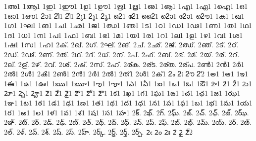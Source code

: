 {%
1അ1
1ആ1
1ഇ1
1ഈ1
1ഉ1
1ഊ1
1ഋ1
1ൠ1
1ഌ1
1ൡ1
1എ1
1ഏ1
1ഐ1
1ഒ1
1ഓ1
1ഔ1
2ാ1
2ി1
2ീ1
2ു1
2ൂ1
2ൃ1
2െ1
2േ1
2ൈ1
2ൊ1
2ോ1
2ൌ1
1ക1
1ഖ1
1ഗ1
1ഘ1
1ങ1
1ച1
1ഛ1
1ജ1
1ഝ1
1ഞ1
1ട1
1ഠ1
1ഡ1
1ഢ1
1ണ1
1ത1
1ഥ1
1ദ1
1ധ1
1ന1
1പ1
1ഫ1
1ബ1
1ഭ1
1മ1
1യ1
1ര1
1റ1 %
1ല1
1ള1
1ഴ1 %
1വ1
1ശ1
1ഷ1
1സ1
1ഹ1
2ക്.
2ഖ്.
2ഗ്.
2ഘ്.
2ങ്.
2ച്.
2ഛ്.
2ജ്.
2ഝ്.
2ഞ്.
2ട്.
2ഠ്.
2ഡ്.
2ഢ്.
2ണ്.
2ത്.
2ഥ്.
2ദ്.
2ധ്.
2ന്.
2പ്.
2ഫ്.
2ബ്.
2ഭ്.
2മ്.
2യ്.
2ര്.
2റ്. %
2ല്.
2ള്.
2ഴ്. %
2വ്.
2ശ്.
2ഷ്.
2സ്.
2ഹ്.
2ര്ക.
2ര്ട.
2ര്ത.
2ര്പ.
2ൺ1
2ൻ1
2ർ1
2ൽ1
2ൾ1
2ൿ1
2ണ്‍1
2ന്‍1
2ര്‍1
2ല്‍1
2ത്‍1
2ള്‍1
2ക്‍1
2ം
2ഃ
2ൗ
2്2
1అ1
1ఆ1
1ఇ1
1ఈ1
1ఉ1
1ఊ1
1ఋ1
1ౠ1
1ఌ1
1ౡ1
1ఎ1
1ఏ1
1ఐ1
1ఒ1
1ఓ1
1ఔ1
2ా1
2ి1
2ీ1
2ు1
2ూ1
2ృ1
2ౄ1
2ె1
2ే1
2ై1
2ొ1
2ో1
2ౌ1
1క1
1ఖ1
1గ1
1ఘ1
1ఙ1
1చ1
1ఛ1
1జ1
1ఝ1
1ఞ1
1ట1
1ఠ1
1డ1
1ఢ1
1ణ1
1త1
1థ1
1ద1
1ధ1
1న1
1ప1
1ఫ1
1బ1
1భ1
1మ1
1య1
1ర1
1ఱ1 %
1ల1
1ళ1
1వ1
1శ1
1ష1
1స1
1హ1
2క్.
2ఖ్.
2గ్.
2ఘ్.
2ఙ్.
2చ్.
2ఛ్.
2జ్.
2ఝ్.
2ఞ్.
2ట్.
2ఠ్.
2డ్.
2ఢ్.
2ణ్.
2త్.
2థ్.
2ద్.
2ధ్.
2న్.
2ప్.
2ఫ్.
2బ్.
2భ్.
2మ్.
2య్.
2ర్.
2ఱ్. %
2ల్.
2ళ్.
2వ్.
2శ్.
2ష్.
2స్.
2హ్.
2ర్క్.
2ర్ట్.
2ర్త్.
2ర్ప్.
2ఁ
2ం
2ః
2ౕ
2ౖ
2్2
}
